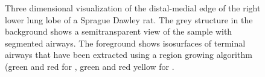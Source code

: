 \begin{figure}
{%
		}%
		\caption{Three dimensional visualization of the distal-medial edge of the right lower lung lobe of a Sprague Dawley rat. The grey structure in the background shows a semitransparent view of the sample with segmented airways. The foreground shows isosurfaces of terminal airways that have been extracted using a region growing algorithm (green and red for , green and red yellow for .}%
	\label{fig:overview}%
\end{figure}

